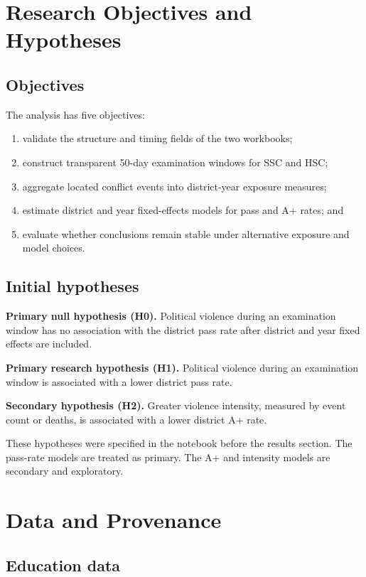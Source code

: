 \documentclass[11pt]{article}
\begin{document}
\section{Research Objectives and Hypotheses}

\subsection{Objectives}

The analysis has five objectives:

\begin{enumerate}
  \item validate the structure and timing fields of the two workbooks;
  \item construct transparent 50-day examination windows for SSC and HSC;
  \item aggregate located conflict events into district-year exposure measures;
  \item estimate district and year fixed-effects models for pass and A+ rates; and
  \item evaluate whether conclusions remain stable under alternative exposure and model choices.
\end{enumerate}

\subsection{Initial hypotheses}

\textbf{Primary null hypothesis (H0).} Political violence during an examination window has no association with the district pass rate after district and year fixed effects are included.

\textbf{Primary research hypothesis (H1).} Political violence during an examination window is associated with a lower district pass rate.

\textbf{Secondary hypothesis (H2).} Greater violence intensity, measured by event count or deaths, is associated with a lower district A+ rate.

These hypotheses were specified in the notebook before the results section. The pass-rate models are treated as primary. The A+ and intensity models are secondary and exploratory.

\section{Data and Provenance}

\subsection{Education data}
\end{document}
